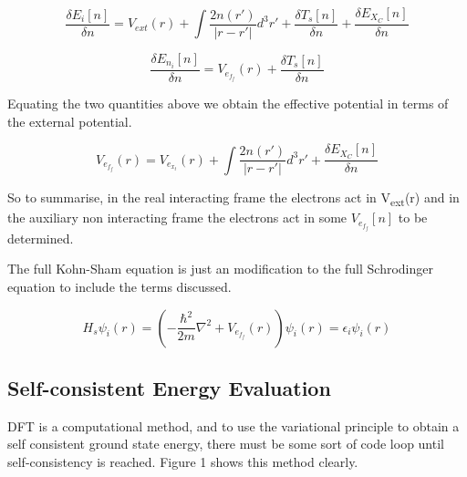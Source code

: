 \documentclass[12pt]{article}
\begin{document}
\begin{equation} \label{2.10} \tag{2.10}
\frac{\delta E_i[n]}{\delta n} = V_{ext}(r) + \int \frac{2n(r')}{|r-r'|}d^3r'  +\frac{\delta T_s[n]}{\delta n} + \frac{\delta E_X_C[n]}{\delta n}
\end{equation}

\begin{equation} \label{2.11} \tag{2.11}
\frac{\delta E_n_i[n]}{\delta n}= V_e_f_f(r) + \frac{\delta T_s[n]}{\delta n}
\end{equation}

Equating the two quantities above we obtain the effective potential in terms of the external potential.

\begin{equation} \label{2.12} \tag{2.12}
V_e_f_f(r)=V_e_x_t(r)  +\int \frac{2n(r')}{|r-r'|}d^3r' + \frac{\delta E_X_C[n]}{\delta n}
\end{equation}

So to summarise, in the real interacting frame the electrons act in  V\textsubscript{ext}(r) and in the auxiliary non interacting frame the electrons act in some $V_e_f_f[n]$ to be determined.

The full Kohn-Sham equation is just an modification to the full Schrodinger equation to include the terms discussed.


\begin{equation} \label{2.12} \tag{2.13}
H_s \psi_i (r) = (-\frac{\hbar^2}{2m}\nabla^2 +V_e_f_f(r) ) \psi_i (r) = \epsilon_i \psi_i (r)
\end{equation}

\subsection{Self-consistent Energy Evaluation}

DFT is a computational method, and to use the variational principle to obtain a self consistent ground state energy, there must be some sort of code loop until self-consistency is reached. Figure 1 shows this method clearly.
\end{document}
